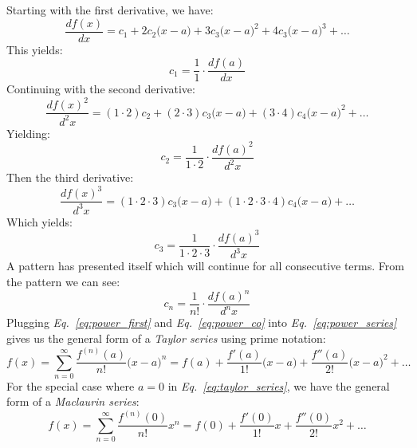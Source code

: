 \vspace{0.5cm}
\noindent
Starting with the first derivative, we have:
    \begin{equation*}
        \frac{df(x)}{dx} = c_1 + 2c_2{\big(x - a\big)} + 3c_3{\big(x - a\big)}^2
        + 4c_3{\big(x - a\big)}^3 + \dots
    \end{equation*}
This yields:
    \begin{equation*}
        c_1 = \frac{1}{1} \cdot \frac{df(a)}{dx}
    \end{equation*}
Continuing with the second derivative:
    \begin{equation*}
        \frac{{df(x)}^2}{d^2x} = (1 \cdot 2)c_2 + (2 \cdot 3)c_3{\big(x - a\big)} + (3 \cdot 4)c_4{\big(x - a\big)}^2
        + \dots
    \end{equation*}
Yielding:
    \begin{equation*}
        c_2 = \frac{1}{1 \cdot 2} \cdot \frac{{df(a)}^2}{d^2x}
    \end{equation*}
Then the third derivative:
    \begin{equation*}
        \frac{{df(x)}^3}{d^3x} = (1 \cdot 2 \cdot 3)c_3{\big(x - a\big)}
        + (1 \cdot 2 \cdot 3 \cdot 4)c_4{\big(x - a\big)} + \dots
    \end{equation*}
Which yields:
    \begin{equation*}
        c_3 = \frac{1}{1 \cdot 2 \cdot 3} \cdot \frac{{df(a)}^3}{d^3x}
    \end{equation*}
A pattern has presented itself which will continue for all consecutive terms.  From the pattern we can see:
    \begin{equation}
        c_n = \frac{1}{n!} \cdot \frac{{df(a)}^n}{d^nx}
        \label{eq:power_co}
    \end{equation}
Plugging \emph{Eq.~\ref{eq:power_first}} and \emph{Eq.~\ref{eq:power_co}} into \emph{Eq.~\ref{eq:power_series}} gives us the general form of a \textit{Taylor series} using prime notation:
    \begin{equation}
        \boxed{f(x) = \sum_{n=0}^{\infty}\frac{f^{(n)}(a)}{n!}{\big(x - a\big)}^n = f(a)
        + \frac{f'(a)}{1!}{\big(x - a\big)} + \frac{f''(a)}{2!}{\big(x - a\big)}^2 + \dots}
        \label{eq:taylor_series}
    \end{equation}
For the special case where $a = 0$ in \emph{Eq.~\ref{eq:taylor_series}}, we have the general form of a \textit{Maclaurin series}:
    \begin{equation}
        \boxed{f(x) = \sum_{n=0}^{\infty}\frac{f^{(n)}(0)}{n!}{x}^n = f(0)
        + \frac{f'(0)}{1!}{x} + \frac{f''(0)}{2!}{x}^2 + \dots}
        \label{eq:maclaurin_series}
    \end{equation}
